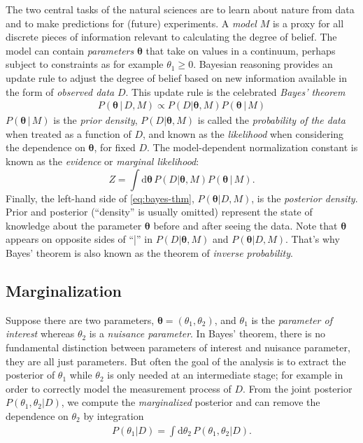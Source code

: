 \documentclass[
10pt,
a4paper,
bibliography=totoc,
captions=nooneline, %
numbers=noenddot,
twoside]{scrbook}
\newcommand{\cond}{\,|\,}
\newcommand\rmdx[1]{\mbox{d}#1\,} %
\newcommand{\scath}{\theta} %
\newcommand{\vecth}{\bm{\theta}} %
\begin{document}
The two central tasks of the natural sciences are to learn about
nature from data and to make predictions for (future) experiments. A
\emph{model} $M$ is a proxy for all discrete pieces of information relevant
to calculating the degree of belief. The model can contain \emph{parameters}
$\vecth$ that take on values in a continuum, perhaps subject to
constraints as for example $\scath_1 \geq 0$. Bayesian reasoning
provides an update rule to adjust the degree of belief based on new
information available in the form of \emph{observed data} $D$. This update
rule is the celebrated \emph{Bayes' theorem}
\begin{align}
  \label{eq:bayes-thm}
  \boxed{  P(\vecth \cond D, M) \propto P(D|\vecth, M) P(\vecth \cond M)
  }
\end{align}
$P(\vecth \cond M)$ is the \emph{prior density}, $P(D|\vecth, M)$ is
called the \emph{probability of the data} when treated as a function
of $D$, and known as the \emph{likelihood} when considering the
dependence on $\vecth$, for fixed $D$. The model-dependent
normalization constant is known as the \emph{evidence} or
\emph{marginal likelihood}:
\begin{equation}
  \label{eq:evidence}
  Z = \int \rmdx{ \vecth} P(D|\vecth, M) P(\vecth \cond M).
\end{equation}
Finally, the left-hand side of \eqref{eq:bayes-thm}, $P(\vecth | D,
M)$, is the \emph{posterior density}. Prior and posterior (``density''
is usually omitted) represent the state of knowledge about the
parameter $\vecth$ before and after seeing the data. Note that
$\vecth$ appears on opposite sides of ``|'' in $P(D|\vecth,M)$ and
$P(\vecth|D,M)$. That's why Bayes' theorem is also known as the
theorem of \emph{inverse probability}.

\subsection{Marginalization} \label{sec:marginalization}

Suppose there are two parameters, $\vecth = (\scath_1, \scath_2)$, and
$\scath_1$ is the \emph{parameter of interest} whereas $\scath_2$ is a
\emph{nuisance parameter}. In Bayes' theorem, there is no fundamental
distinction between parameters of interest and nuisance parameter,
they are all just parameters. But often the goal of the analysis is to
extract the posterior of $\scath_1$ while $\scath_2$ is only needed at
an intermediate stage; for example in order to correctly model the
measurement process of $D$. From the joint posterior $P(\scath_1,
\scath_2 | D)$, we compute the \emph{marginalized} posterior and can
remove the dependence on $\scath_2$ by integration
\begin{align}
  \label{eq:marginal}
  P(\scath_1 | D) = \int \rmdx{\scath_2} P(\scath_1, \scath_2 | D).
\end{align}
\end{document}
